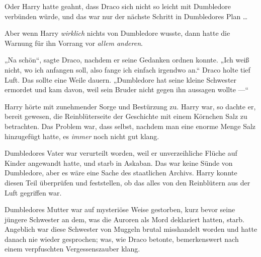 Oder Harry hatte geahnt, dass Draco sich nicht so leicht mit Dumbledore verbünden würde, und das war nur der nächste Schritt in Dumbledores Plan …

Aber wenn Harry \emph{wirklich} nichts von Dumbledore wusste, dann hatte die Warnung für ihn Vorrang vor \emph{allem anderen}.

„Na schön“, sagte Draco, nachdem er seine Gedanken ordnen konnte.
„Ich weiß nicht, wo ich anfangen soll, also fange ich einfach irgendwo an.“ Draco holte tief Luft. Das sollte eine Weile dauern.
„Dumbledore hat seine kleine Schwester ermordet und kam davon, weil sein Bruder nicht gegen ihn aussagen wollte —“

\later

Harry hörte mit zunehmender Sorge und Bestürzung zu. Harry war, so dachte er, bereit gewesen, die Reinblüterseite der Geschichte mit einem Körnchen Salz zu betrachten. Das Problem war, dass selbst, nachdem man eine enorme Menge Salz hinzugefügt hatte, es \emph{immer} noch nicht gut klang.

Dumbledores Vater war verurteilt worden, weil er unverzeihliche Flüche auf Kinder angewandt hatte, und starb in Askaban. Das war keine Sünde von Dumbledore, aber es wäre eine Sache des staatlichen Archivs. Harry konnte diesen Teil überprüfen und feststellen, ob das alles von den Reinblütern aus der Luft gegriffen war.

Dumbledores Mutter war auf mysteriöse Weise gestorben, kurz bevor seine jüngere Schwester an dem, was die Auroren als Mord deklariert hatten, starb. Angeblich war diese Schwester von Muggeln brutal misshandelt worden und hatte danach nie wieder gesprochen; was, wie Draco betonte, bemerkenswert nach einem verpfuschten Vergessenszauber klang.

